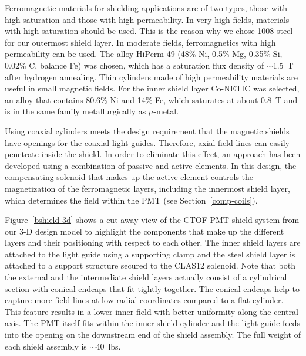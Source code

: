 \documentclass{elsart}
\begin{document}
Ferromagnetic materials for shielding applications are of two types, those with high saturation
and those with high permeability. In very high fields, materials with high saturation should
be used. This is the reason why we chose 1008 steel for our outermost shield layer. In
moderate fields, ferromagnetics with high permeability can be used. The alloy HiPerm-49
(48\% Ni, 0.5\% Mg, 0.35\% Si, 0.02\% C, balance Fe) was chosen, which has a saturation flux 
density of $\sim$1.5~T after hydrogen annealing. Thin cylinders made of high permeability 
materials are useful in small magnetic fields. For the inner shield layer Co-NETIC was selected, 
an alloy that contains 80.6\% Ni and 14\% Fe, which saturates at about 0.8~T and is in the same 
family metallurgically as $\mu$-metal.

Using coaxial cylinders meets the design requirement that the magnetic shields have openings 
for the coaxial light guides. Therefore, axial field lines can easily penetrate inside the 
shield. In order to eliminate this effect, an approach has been developed using a 
combination of passive and active elements. In this design, the compensating solenoid that 
makes up the active element controls the magnetization of the ferromagnetic layers, including 
the innermost shield layer, which determines the field within the PMT (see 
Section~\ref{comp-coils}).

Figure~\ref{bshield-3d} shows a cut-away view of the CTOF PMT shield system from our 3-D design 
model to highlight the components that make up the different layers and their positioning with 
respect to each other. The inner shield layers are attached to the light guide using a 
supporting clamp and the steel shield layer is attached to a support structure secured to the 
CLAS12 solenoid. Note that both the external and the intermediate shield layers actually 
consist of a cylindrical section with conical endcaps that fit tightly together. The conical 
endcaps help to capture more field lines at low radial coordinates compared to a flat cylinder. 
This feature results in a lower inner field with better uniformity along the central axis. The 
PMT itself fits within the inner shield cylinder and the light guide feeds into the opening on 
the downstream end of the shield assembly. The full weight of each shield assembly is 
$\sim$40~lbs.
\end{document}
